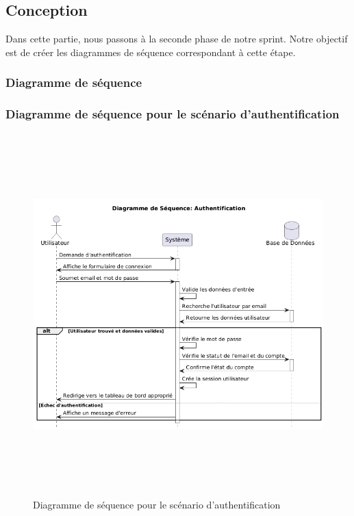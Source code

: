 \subsection{Conception}
\noindent Dans cette partie, nous passons à la seconde phase de notre sprint. Notre objectif est de créer les diagrammes de séquence correspondant à cette étape.

\subsubsection{Diagramme de séquence}

\subsubsection{Diagramme de séquence pour le scénario d'authentification}
\begin{figure}[H]
    \centering
    \includegraphics[width=15cm,height=14cm]{images/authentifiaction.png}
    \caption{Diagramme de séquence pour le scénario d'authentification}
\end{figure}


